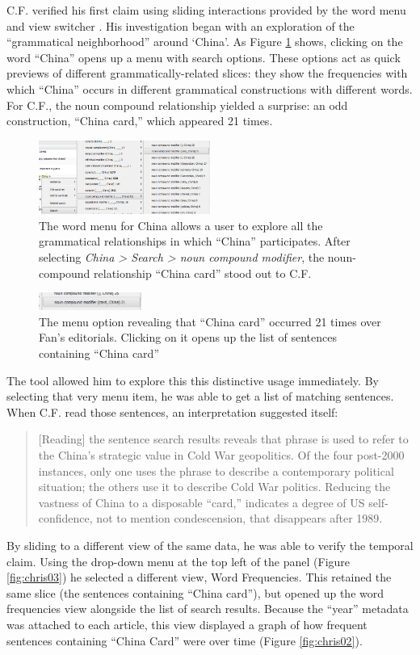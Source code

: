 \documentclass{sig-alternate}
\begin{document}
C.F. verified his first claim using sliding interactions provided by the word menu and view switcher . His investigation began with an exploration of the ``grammatical neighborhood'' around `China'. As Figure \ref{fig:chris01} shows, clicking on the word ``China'' opens up a menu with search options. These options act as quick previews of different grammatically-related slices: they show the frequencies with which ``China'' occurs in different grammatical constructions with different words.  For C.F., the noun compound relationship yielded a surprise: an odd construction, ``China card,'' which appeared 21 times.


\begin{figure}[h!]
\includegraphics[width=0.5\textwidth]{fig/chris/01.png}
\caption{The word menu for China allows a user to explore all the grammatical relationships in which ``China'' participates.   After selecting \emph{China > Search > noun compound modifier}, the noun-compound relationship ``China card'' stood out to C.F. \label{fig:chris01}}
\end{figure}

\begin{figure}[h!]
\includegraphics[width=0.3\textwidth]{fig/chris/01b.png}
\caption{ The menu option revealing that ``China card'' occurred 21 times over Fan's editorials. Clicking on it opens up the list of sentences containing ``China card''  \label{fig:chris01b}}
\end{figure}

The tool allowed him to explore this this distinctive usage immediately. By selecting that very menu item, he was able to get a list of matching sentences. When C.F. read those sentences, an interpretation suggested itself:
\begin{quote}[Reading] the sentence search results reveals that phrase is used to refer to the China's strategic value in Cold War geopolitics. Of the four post-2000 instances, only one uses the phrase to describe a contemporary political situation; the others use it to describe Cold War politics. Reducing the vastness of China to a disposable ``card,'' indicates a degree of US self-confidence, not to mention condescension, that disappears after 1989.\end{quote}
By sliding to a different view of the same data, he was able to verify the temporal claim. Using the drop-down menu at the top left of the panel (Figure \ref{fig:chris03}) he selected a different view, Word Frequencies. This retained the same slice (the sentences containing ``China card''), but opened up the word frequencies view alongside the list of search results.  Because the ``year'' metadata was attached to each article, this view displayed a graph of how frequent  sentences containing ``China Card'' were over time (Figure \ref{fig:chris02}). 
\end{document}
